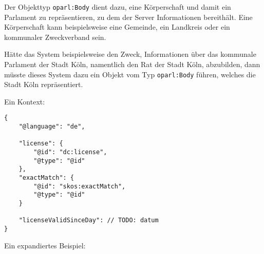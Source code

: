 \documentclass[,a4paper]{article}
\begin{document}

Der Objekttyp \texttt{oparl:Body} dient dazu, eine Körperschaft und
damit ein Parlament zu repräsentieren, zu dem der Server Informationen
bereithält. Eine Körperschaft kann beispielsweise eine Gemeinde, ein
Landkreis oder ein kommunaler Zweckverband sein.

Hätte das System beispielsweise den Zweck, Informationen über das
kommunale Parlament der Stadt Köln, namentlich den Rat der Stadt Köln,
abzubilden, dann müsste dieses System dazu ein Objekt vom Typ
\texttt{oparl:Body} führen, welches die Stadt Köln repräsentiert.

Ein Kontext:

\begin{verbatim}
{
    "@language": "de",
    
    "license": {
        "@id": "dc:license",
        "@type": "@id"
    },
    "exactMatch": {
        "@id": "skos:exactMatch",
        "@type": "@id"
    }
    
    "licenseValidSinceDay": // TODO: datum
}
\end{verbatim}

Ein expandiertes Beispiel:
\end{document}
